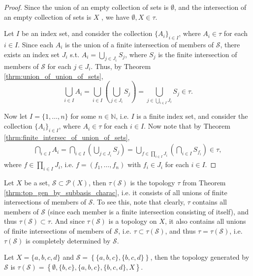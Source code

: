 \begin{proof}
	Since the union of an empty collection of sets is $\emptyset$, and the intersection of an empty collection of sets is $X$ \cite{370201}, we have $\emptyset, X\in\tau$. 
	
	Let $I$ be an index set, and consider the collection $\{ A_i \}_{i\in I}$, where $A_i\in\tau$ for each $i\in I$. Since each $A_i$ is the union of a finite intersection of members of $\mathscr S$, there exists an index set $J_i$ s.t. $A_i = \bigcup_{j\in J_i}S_{j}$, where $S_j$ is the finite intersection of members of $\mathscr S$ for each $j\in J_i$. Thus, by Theorem \ref{thrm:union_of_union_of_sets}, 
	$$\bigcup_{i\in I}A_i = \bigcup_{i\in I}\left(\bigcup_{j\in J_i}{S_j}\right) = \bigcup_{j\in \bigcup_{i\in I}J_i}S_j\in \tau.$$
	
	Now let $I = \{1, \dots, n\}$ for some $n\in\mathbb N$, i.e. $I$ is a finite index set, and consider the collection $\{A_i\}_{i\in I}$, where $A_i\in\tau$ for each $i\in I$. Now note that by Theorem \ref{thrm:finite_intersec_of_union_of_sets},
	\begin{align}\label{eq:finite_intersec_arbitrary_unions}
		\bigcap_{i\in I}A_i = \bigcap_{i\in I}\left(\bigcup_{j\in J_i}S_j\right) = \bigcup_{f\in \prod_{i\in I} J_i}\left(\bigcap_{i\in I}S_{f_i}\right)\in\tau,
	\end{align}
	where $f\in\prod_{i\in I}J_i$, i.e. $f = (f_1, \dots, f_n)$ with $f_i\in J_i$ for each $i\in I$.
\end{proof}

\begin{remark}
	Let $X$ be a set, $\mathscr S\subset \mathscr P(X)$, then $\tau(\mathscr S)$ is the topology $\tau$ from Theorem \ref{thrm:top_gen_by_subbasis_charac}, i.e. it consists of all unions of finite intersections of members of $\mathscr S$. To see this, note that clearly, $\tau$ contains all members of $\mathscr S$ (since each member is a finite intersection consisting of itself), and thus $\tau(\mathscr S)\subset \tau$. And since $\tau(\mathscr S)$ is a topology on $X$, it also contains all unions of finite intersections of members of $\mathscr S$, i.e. $\tau\subset \tau(\mathscr S)$, and thus $\tau = \tau(\mathscr S)$, i.e. $\tau(\mathscr S)$ is completely determined by $\mathscr S$.
\end{remark}

\begin{exmp}\label{exmp:subbasis}
	Let $X = \{a, b, c, d\}$ and $\mathscr S = \left\{ \{a, b, c\}, \{b, c, d\} \right\}$, then the topology generated by $\mathscr S$ is $\tau(\mathscr S) = \left\{ \emptyset, \{b, c\}, \{a, b, c\}, \{b, c, d\}, X \right\}$.
\end{exmp}

